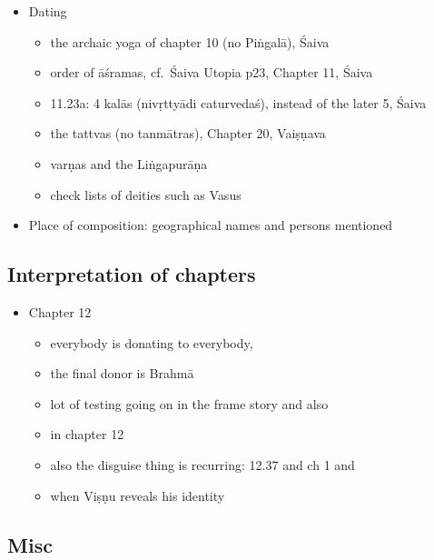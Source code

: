 \documentclass[]{article}
\providecommand{\tightlist}{%
  \setlength{\itemsep}{0pt}\setlength{\parskip}{0pt}}
\begin{document}
\begin{itemize}
\tightlist
\item
  Dating

  \begin{itemize}
  \tightlist
  \item
    the archaic yoga of chapter 10 (no Piṅgalā), Śaiva
  \item
    order of āśramas, cf.~Śaiva Utopia p23, Chapter 11, Śaiva
  \item
    11.23a: 4 kalās (nivṛttyādi caturvedaś), instead of the later 5,
    Śaiva
  \item
    the tattvas (no tanmātras), Chapter 20, Vaiṣṇava
  \item
    varṇas and the Liṅgapurāṇa
  \item
    check lists of deities such as Vasus
  \end{itemize}
\item
  Place of composition: geographical names and persons mentioned
\end{itemize}

\hypertarget{interpretation-of-chapters}{%
\subsection{Interpretation of
chapters}\label{interpretation-of-chapters}}

\begin{itemize}
\tightlist
\item
  Chapter 12

  \begin{itemize}
  \tightlist
  \item
    everybody is donating to everybody,
  \item
    the final donor is Brahmā
  \item
    lot of testing going on in the frame story and also
  \item
    in chapter 12
  \item
    also the disguise thing is recurring: 12.37 and ch 1 and
  \item
    when Viṣṇu reveals his identity
  \end{itemize}
\end{itemize}

\hypertarget{misc}{%
\subsection{Misc}\label{misc}}
\end{document}
